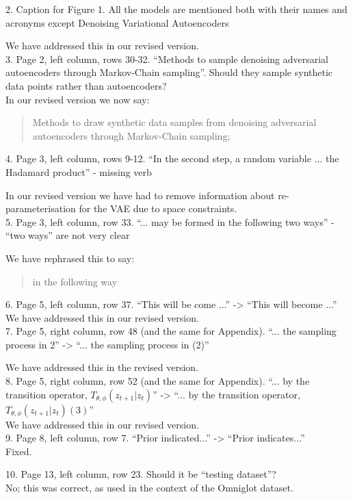 \documentclass[a4paper,11pt]{article}
\begin{document}
{\color{blue}
2. Caption for Figure 1. All the models are mentioned both with their names and acronyms except Denoising Variational Autoencoders
}

We have addressed this in our revised version.\\

{\color{blue}
3. Page 2, left column, rows 30-32. ``Methods to sample denoising adversarial autoencoders through Markov-Chain sampling''. Should they sample synthetic data points rather than autoencoders?
}\\

In our revised version we now say:
\begin{quote}
{\color{red}Methods to draw synthetic data samples from denoising adversarial autoencoders through Markov-Chain sampling;}
\end{quote}

{\color{blue}
4. Page 3, left column, rows 9-12. ``In the second step, a random variable ... the Hadamard product'' - missing verb
}

In our revised version we have had to remove information about  re-parameterisation for the VAE due to space constraints.\\

{\color{blue}
5. Page 3, left column, row 33. ``... may be formed in the following two ways'' - ``two ways'' are not very clear\\
}

We have rephrased this to say:

\begin{quote}
{\color{red} in the following way}
\end{quote}

{\color{blue}
6. Page 5, left column, row 37. ``This will be come ...'' -> ``This will become ...''
}\\

We have addressed this in our revised version.\\

{\color{blue}
7. Page 5, right column, row 48 (and the same for Appendix). ``... the sampling process in 2'' -> ``... the sampling process in (2)''\\
}

We have addressed this in the revised version.\\

{\color{blue} 8. Page 5, right column, row 52 (and the same for Appendix). ``... by the transition operator, $T_{\theta, \phi}(z_{t+1}|z_t)$'' -> ``... by the transition operator, $T_{\theta, \phi}(z_{t+1}|z_t) (3)$''}\\

We have addressed this in our revised version.\\

{\color{blue} 9. Page 8, left column, row 7. ``Prior indicated...'' -> ``Prior indicates...''}\\

Fixed.

{\color{blue} 10. Page 13, left column, row 23. Should it be ``testing dataset''?}\\

No; this was correct, as used in the context of the Omniglot dataset.\\
\end{document}
